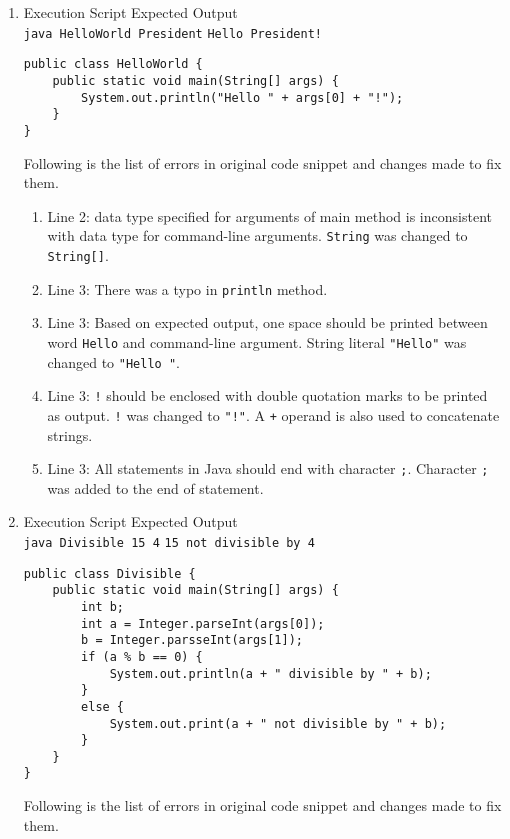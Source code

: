 \documentclass[12pt,letterpaper,twoside]{article}
\begin{document}
\begin{enumerate}[label=\textbf{(\alph*)}]
\item Execution Script \hfill Expected Output\\
\texttt{java HelloWorld President} \hfill \texttt{Hello President!}
\begin{lstlisting}
public class HelloWorld {
	public static void main(String[] args) {
		System.out.println("Hello " + args[0] + "!");
	}
}
\end{lstlisting}

Following is the list of errors in original code snippet and changes made to fix them.

\begin{enumerate}[label=\arabic*.]
\item Line 2: data type specified for arguments of main method is inconsistent with data type for command-line arguments. \texttt{String} was changed to \texttt{String[]}.
\item Line 3: There was a typo in \texttt{println} method.
\item Line 3: Based on expected output, one space should be printed between word \texttt{Hello} and command-line argument. String literal \texttt{"Hello"} was changed to \texttt{"Hello "}.
\item Line 3: \texttt{!} should be enclosed with double quotation marks to be printed as output. \texttt{!} was changed to \texttt{"!"}. A \texttt{+} operand is also used to concatenate strings.
\item Line 3: All statements in Java should end with character \texttt{;}. Character \texttt{;} was added to the end of statement.
\end{enumerate}

\item Execution Script \hfill Expected Output\\
\texttt{java Divisible 15 4} \hfill \texttt{15 not divisible by 4}

\begin{lstlisting}
public class Divisible {
	public static void main(String[] args) {
		int b;
		int a = Integer.parseInt(args[0]);
		b = Integer.parsseInt(args[1]);
		if (a % b == 0) {
			System.out.println(a + " divisible by " + b);
		}
		else {
			System.out.print(a + " not divisible by " + b);
		}
	}
}
\end{lstlisting}

Following is the list of errors in original code snippet and changes made to fix them.


\end{enumerate}
\end{document}
